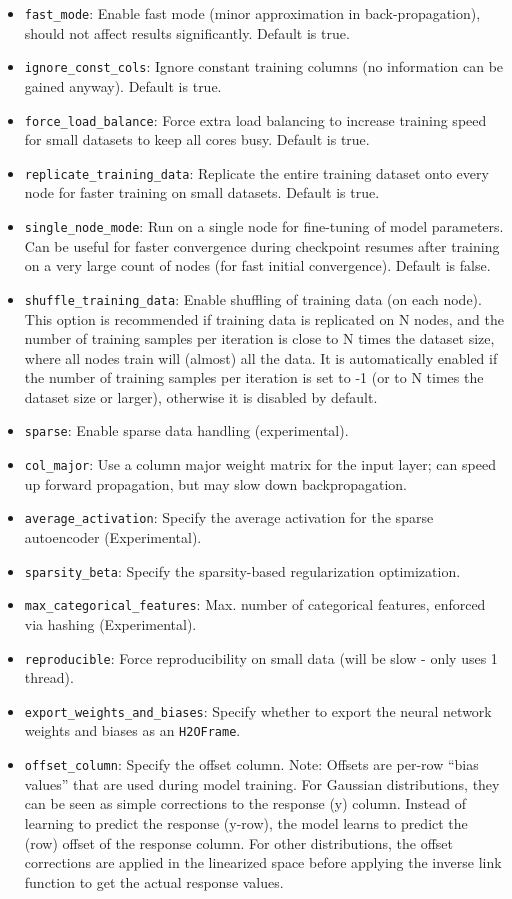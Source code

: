 \documentclass{article}[11pt]
\begin{document}
\begin{itemize}
\item \texttt{fast\_mode}: Enable fast mode (minor approximation in back-propagation), should not affect results significantly. Default is true.
\item \texttt{ignore\_const\_cols}: Ignore constant training columns (no information can be gained anyway). Default is true.
\item \texttt{force\_load\_balance}:  Force extra load balancing to increase training speed for small datasets to keep all cores busy. Default is true.
\item \texttt{replicate\_training\_data}:  Replicate the entire training dataset onto every node for faster training on small datasets. Default is true.
\item \texttt{single\_node\_mode}:  Run on a single node for fine-tuning of model parameters. Can be useful for faster convergence during checkpoint resumes after training on a very large count of nodes (for fast initial convergence). Default is false.
\item \texttt{shuffle\_training\_data}: Enable shuffling of training data (on each node). This option is recommended if training data is replicated on N nodes, and the number of training samples per iteration is close to N times the dataset size, where all nodes train will (almost) all the data. It is automatically enabled if the number of training samples per iteration is set to -1 (or to N times the dataset size or larger), otherwise it is disabled by default.
\item \texttt{sparse}: Enable sparse data handling (experimental).
\item \texttt{col\_major}: Use a column major weight matrix for the input layer; can speed up forward propagation, but may slow down backpropagation. 
\item \texttt{average\_activation}: Specify the average activation for the sparse autoencoder (Experimental). 
\item \texttt{sparsity\_beta}: Specify the sparsity-based regularization optimization. 
\item \texttt{max\_categorical\_features}:  Max. number of categorical features, enforced via hashing (Experimental).
\item \texttt{reproducible}: Force reproducibility on small data (will be slow - only uses 1 thread).
\item \texttt{export\_weights\_and\_biases}: Specify whether to export the neural network weights and biases as an \texttt{H2OFrame}. 
\item \texttt{offset\_column}: Specify the offset column. Note: Offsets are per-row “bias values” that are used during model training. For Gaussian distributions, they can be seen as simple corrections to the response (y) column. Instead of learning to predict the response (y-row), the model learns to predict the (row) offset of the response column. For other distributions, the offset corrections are applied in the linearized space before applying the inverse link function to get the actual response values. 

\end{itemize}
\end{document}
